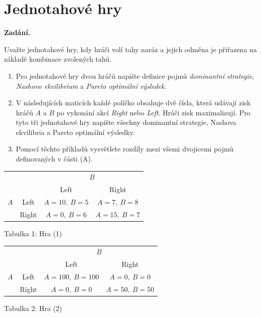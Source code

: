 \section{Jednotahové hry}

\noindent\textbf{Zadání.}\par
Uvažte jednotahové hry, kdy hráči volí tahy naráz a jejich odměna je přiřazena na základě kombinace zvolených tahů.
\begin{enumerate}[label=(\Alph*),nosep]
  \item Pro jednotahové hry dvou hráčů napište definice pojmů \textit{dominantní strategie}, \textit{Nashovo ekvilibrium} a \textit{Pareto optimální výsledek}.
  \item V následujících maticích každé políčko obsahuje dvě čísla, která udávají zisk hráčů $A$ a $B$ po vykonání akcí \textit{Right} nebo \textit{Left}. Hráči zisk maximalizují. Pro tyto tři jednotahové hry napište všechny dominantní strategie, Nashova ekvilibria a Pareto optimální výsledky.
  \item Pomocí těchto příkladů vysvětlete rozdíly mezi všemi dvojicemi pojmů definovaných v části (A).
\end{enumerate}

\begin{center}
\begin{tabular}{cc|c|c}
  & & \multicolumn{2}{c}{$B$} \\
  & & Left & Right \\
\hline
$A$ & Left  & $A = 10,\ B = 5$ & $A = 7,\ B = 8$ \\
    & Right & $A = 0,\ B = 6$  & $A = 15,\ B = 7$ \\
\end{tabular}

\smallskip
Tabulka 1: Hra (1)
\end{center}

\begin{center}
\begin{tabular}{cc|c|c}
  & & \multicolumn{2}{c}{$B$} \\
  & & Left & Right \\
\hline
$A$ & Left  & $A = 100,\ B = 100$ & $A = 0,\ B = 0$ \\
    & Right & $A = 0,\ B = 0$     & $A = 50,\ B = 50$ \\
\end{tabular}

\smallskip
Tabulka 2: Hra (2)
\end{center}

